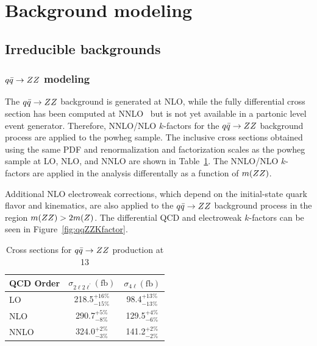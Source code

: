 \section{Background modeling}

\subsection{Irreducible backgrounds}
\label{sec:irrbkgd}

\subsubsection{$q\bar{q}\to ZZ$ modeling}
\label{sec:redbkgd}

The $q\bar{q}\to ZZ$ background is generated at NLO, while the fully differential cross section has been computed at 
NNLO~\cite{Grazzini2015407} but is not yet available in a partonic level event generator. Therefore, NNLO/NLO 
$k$-factors for the $q\bar{q}\to ZZ$ background process are applied to the {\sc powheg} sample. The inclusive cross 
sections obtained using the same PDF and renormalization and factorization scales as the {\sc powheg} sample
at LO, NLO, and NNLO are shown in Table~\ref{tab:qqZZXS}. The NNLO/NLO $k$-factors are applied in the analysis
differentally as a function of $m(ZZ)$. 

Additional NLO electroweak corrections, which depend on the initial-state quark flavor and kinematics,
are also applied to the $q\bar{q}\to ZZ$ background process in the region $m(Z Z)>2m(Z)$. The differential QCD and electroweak $k$-factors can be seen in 
Figure~\ref{fig:qqZZKfactor}.

\begin{table}[h]
    \centering
    \begin{tabular}{l|c|c} 
\hline %
QCD Order  & $\sigma_{2\ell2\ell^{\prime}} (\mathrm{fb})$  & $\sigma_{4\ell} (\mathrm{fb})$  \\
\hline %
LO    & 218.5$^{+16\%}_{-15\%}$ & 98.4$^{+13\%}_{-13\%}$ \\
NLO   & 290.7$^{+5\%}_{-8\%}$   & 129.5$^{+4\%}_{-6\%}$ \\
NNLO  & 324.0$^{+2\%}_{-3\%}$   & 141.2$^{+2\%}_{-2\%}$ \\
\hline %
    \end{tabular}
    \caption{Cross sections for $q\bar{q}\to ZZ$ production at 13 \TeV}
    \label{tab:qqZZXS}
\end{table}

